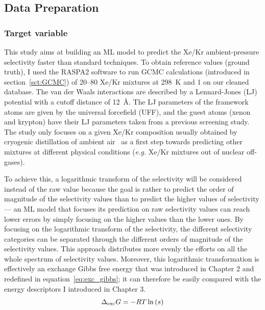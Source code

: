 \documentclass[main]{subfiles}
\begin{document}
\subsection{Data Preparation}


\subsubsection{Target variable}

This study aims at building an ML model to predict the Xe/Kr ambient-pressure selectivity faster than standard techniques. To obtain reference values (ground truth), I used the RASPA2 software\autocite{dubbeldam2016} to run GCMC calculations (introduced in section~\ref{sct:GCMC}) of 20–80 Xe/Kr mixtures at \SI{298}{\kelvin} and \SI{1}{\atm} on our cleaned database. The van der Waals interactions are described by a Lennard-Jones (LJ) potential with a cutoff distance of \SI{12}{\angstrom}. The LJ parameters of the framework atoms are given by the universal forcefield (UFF),\autocite{rappe1992} and the guest atoms (xenon and krypton) have their LJ parameters taken from a previous screening study.\autocite{Ryan_2010} The study only focuses on a given Xe/Kr composition usually obtained by cryogenic distillation of ambient air~\autocite{kerry2007industrial} as a first step towards predicting other mixtures at different physical conditions (\emph{e.g.} Xe/Kr mixtures out of nuclear off-gases). 

To achieve this, a logarithmic transform of the selectivity will be considered instead of the raw value because the goal is rather to predict the order of magnitude of the selectivity values than to predict the higher values of selectivity --- an ML model that focuses its prediction on raw selectivity values can reach lower errors by simply focusing on the higher values than the lower ones. By focusing on the logarithmic transform of the selectivity, the different selectivity categories can be separated through the different orders of magnitude of the selectivity values. This approach distributes more evenly the efforts on all the whole spectrum of selectivity values. Moreover, this logarithmic transformation is effectively an exchange Gibbs free energy that was introduced in Chapter 2 and redefined in equation~\ref{eq:exc_gibbs}; it can therefore be easily compared with the energy descriptors I introduced in Chapter 3.
\begin{equation}\label{eq:exc_gibbs}
  \Delta_{\text{exc}}G = -RT \ln\left(s\right)
\end{equation}
\end{document}
